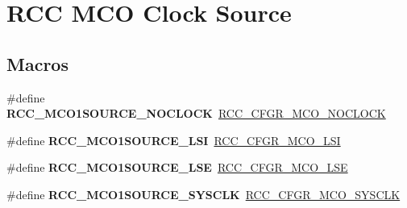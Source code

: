\hypertarget{group___r_c_c___m_c_o___clock___source}{}\section{R\+CC M\+CO Clock Source}
\label{group___r_c_c___m_c_o___clock___source}
\subsection*{Macros}
\begin{DoxyCompactItemize}
\item 
\mbox{\label{group___r_c_c___m_c_o___clock___source_ga725a16362f3324ef5866dc5a1ff07cf5}} 
\#define {\bfseries R\+C\+C\+\_\+\+M\+C\+O1\+S\+O\+U\+R\+C\+E\+\_\+\+N\+O\+C\+L\+O\+CK}~\hyperlink{group___peripheral___registers___bits___definition_gab345908eef02b3029dd78be58baa0c8d}{R\+C\+C\+\_\+\+C\+F\+G\+R\+\_\+\+M\+C\+O\+\_\+\+N\+O\+C\+L\+O\+CK}
\item 
\mbox{\label{group___r_c_c___m_c_o___clock___source_ga4ada18d28374df66c1b6da16606c23d8}} 
\#define {\bfseries R\+C\+C\+\_\+\+M\+C\+O1\+S\+O\+U\+R\+C\+E\+\_\+\+L\+SI}~\hyperlink{group___peripheral___registers___bits___definition_ga96c817553f5f226b1d661b1448ed820a}{R\+C\+C\+\_\+\+C\+F\+G\+R\+\_\+\+M\+C\+O\+\_\+\+L\+SI}
\item 
\mbox{\label{group___r_c_c___m_c_o___clock___source_gaa01b6cb196df3a4ad690f8bcaa4d0621}} 
\#define {\bfseries R\+C\+C\+\_\+\+M\+C\+O1\+S\+O\+U\+R\+C\+E\+\_\+\+L\+SE}~\hyperlink{group___peripheral___registers___bits___definition_gad10ee688b7cf27e652ffd003f177fdcd}{R\+C\+C\+\_\+\+C\+F\+G\+R\+\_\+\+M\+C\+O\+\_\+\+L\+SE}
\item 
\mbox{\label{group___r_c_c___m_c_o___clock___source_gae8ca2959a1252ecd319843da02c79526}} 
\#define {\bfseries R\+C\+C\+\_\+\+M\+C\+O1\+S\+O\+U\+R\+C\+E\+\_\+\+S\+Y\+S\+C\+LK}~\hyperlink{group___peripheral___registers___bits___definition_gaecf3b078108fdaf7e66d15ae71ec4181}{R\+C\+C\+\_\+\+C\+F\+G\+R\+\_\+\+M\+C\+O\+\_\+\+S\+Y\+S\+C\+LK}
\item 
\mbox{\label{group___r_c_c___m_c_o___clock___source_gad99c388c455852143220397db3730635}} 

\end{DoxyCompactItemize}
